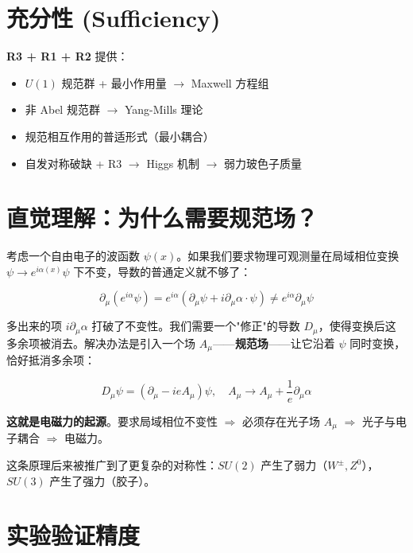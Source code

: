 \section{充分性 (Sufficiency)}

\textbf{R3 + R1 + R2} 提供：
\begin{itemize}
  \item $U(1)$ 规范群 + 最小作用量 $\to$ Maxwell 方程组
  \item 非 Abel 规范群 $\to$ Yang-Mills 理论
  \item 规范相互作用的普适形式（最小耦合）
  \item 自发对称破缺 + R3 $\to$ Higgs 机制 $\to$ 弱力玻色子质量
\end{itemize}

\section{直觉理解：为什么需要规范场？}

考虑一个自由电子的波函数 $\psi(x)$。如果我们要求物理可观测量在局域相位变换 $\psi \to e^{i\alpha(x)}\psi$ 下不变，导数的普通定义就不够了：

\[
\partial_\mu(e^{i\alpha}\psi) = e^{i\alpha}(\partial_\mu\psi + i\partial_\mu\alpha \cdot \psi) \neq e^{i\alpha}\partial_\mu\psi
\]

多出来的项 $i\partial_\mu\alpha$ 打破了不变性。我们需要一个"修正"的导数 $D_\mu$，使得变换后这多余项被消去。解决办法是引入一个场 $A_\mu$——\textbf{规范场}——让它沿着 $\psi$ 同时变换，恰好抵消多余项：

\[
D_\mu\psi = (\partial_\mu - ieA_\mu)\psi, \quad A_\mu \to A_\mu + \frac{1}{e}\partial_\mu\alpha
\]

\textbf{这就是电磁力的起源}。要求局域相位不变性 $\Rightarrow$ 必须存在光子场 $A_\mu$ $\Rightarrow$ 光子与电子耦合 $\Rightarrow$ 电磁力。

这条原理后来被推广到了更复杂的对称性：$SU(2)$ 产生了弱力（$W^\pm, Z^0$），$SU(3)$ 产生了强力（胶子）。

\section*{实验验证精度}

